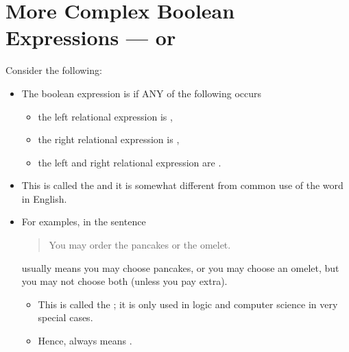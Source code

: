 \documentclass[letterpaper,10pt,english]{sphinxmanual}
\begin{document}
\section{More Complex Boolean Expressions — or}
\label{\detokenize{lecture_notes/lec06_conditionals1:more-complex-boolean-expressions-or}}
Consider the following:
\begin{quote}

%
\begin{sphinxVerbatim}[commandchars=\\\{\}]
  
  
       
\end{sphinxVerbatim}
\end{quote}
\begin{itemize}
\item {} 
The boolean expression is  if ANY of the following occurs
\begin{itemize}
\item {} 
the left relational expression is ,

\item {} 
the right relational expression is ,

\item {} 
 the left and right relational expression are .

\end{itemize}

\item {} 
This is called the  and it is somewhat different from
common use of the word  in English.

\item {} 
For examples, in the sentence
\begin{quote}

You may order the pancakes or the omelet.
\end{quote}

usually means you may choose pancakes, or you may choose an omelet,
but you may not choose both (unless you pay extra).
\begin{itemize}
\item {} 
This is called the ; it is only used in logic and
computer science in very special cases.

\item {} 
Hence,  always means .

\end{itemize}

\end{itemize}
\end{document}
